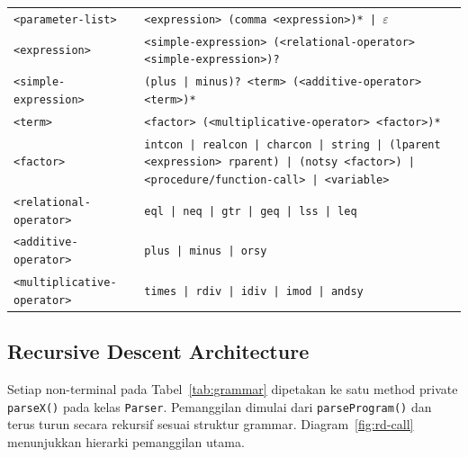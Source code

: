 \documentclass[11pt,a4paper]{article}
\begin{document}
\begin{longtable}{l p{12cm}}
\texttt{<parameter-list>}         & \texttt{<expression> (comma <expression>)* | $\varepsilon$} \\
\texttt{<expression>}             & \texttt{<simple-expression> (<relational-operator> <simple-expression>)?} \\
\texttt{<simple-expression>}      & \texttt{(plus | minus)?\ <term> (<additive-operator> <term>)*} \\
\texttt{<term>}                   & \texttt{<factor> (<multiplicative-operator> <factor>)*} \\
\texttt{<factor>}                 & \texttt{intcon | realcon | charcon | string | (lparent <expression> rparent) | (notsy <factor>) | <procedure/function-call> | <variable>} \\
\texttt{<relational-operator>}    & \texttt{eql | neq | gtr | geq | lss | leq} \\
\texttt{<additive-operator>}      & \texttt{plus | minus | orsy} \\
\texttt{<multiplicative-operator>}& \texttt{times | rdiv | idiv | imod | andsy} \\
\bottomrule
\end{longtable}
\renewcommand{\arraystretch}{1.15}

\subsection{Recursive Descent Architecture}

Setiap non-terminal pada Tabel~\ref{tab:grammar} dipetakan ke satu method
private \texttt{parseX()} pada kelas \texttt{Parser}. Pemanggilan dimulai dari
\texttt{parseProgram()} dan terus turun secara rekursif sesuai struktur grammar.
Diagram~\ref{fig:rd-call} menunjukkan hierarki pemanggilan utama.
\end{document}
